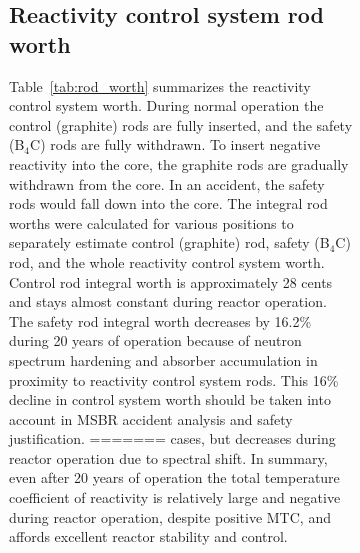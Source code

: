 \begin{figure}[htp!]
\begin{figure}[ht!]
\subsection{Reactivity control system rod worth}
Table~\ref{tab:rod_worth} summarizes the reactivity control system worth. During 
normal operation the control (graphite) rods are fully inserted, and the safety 
(B$_4$C) rods are fully withdrawn. To insert negative reactivity into the core, 
the graphite rods are gradually withdrawn from the core. In an accident, the 
safety rods would fall down into the core. The integral rod worths were 
calculated for various positions to separately estimate control (graphite) rod, 
safety (B$_4$C) rod, and the whole reactivity control system worth. Control rod 
integral worth is approximately 28 cents and stays almost constant during 
reactor operation. The safety rod integral worth decreases by  16.2\% during 20 
years of operation because of neutron spectrum hardening and absorber 
accumulation in proximity to reactivity control system rods. This 16\% decline 
in control system worth should be taken into account in \gls{MSBR} accident 
analysis and safety justification.
=======
cases, but decreases during reactor operation due to spectral shift. In 
summary, even after 20 years of operation the total temperature coefficient of 
reactivity is relatively large and negative during reactor operation, despite 
positive MTC, and affords excellent reactor stability and control.


\end{figure}
\end{figure}
